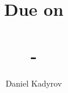 \documentclass{homework}
\title{
    \Title \\
    \vspace{2mm}
    \large
    Due on \DueDate \\
    \ClassName \\ 
    \ClassNumber - \ClassSection \\
    \Instructor
}
\author{Daniel Kadyrov}
\date{}
\newenvironment{problem}{
    \bfseries
}
\begin{document}
\maketitle
\thispagestyle{empty}

\section{}

\begin{problem}
    This is an example of a problem statement 

\end{problem}

\subsection{}

\newpage
\begin{problem}
    problem 2
\end{problem}
\end{document}
